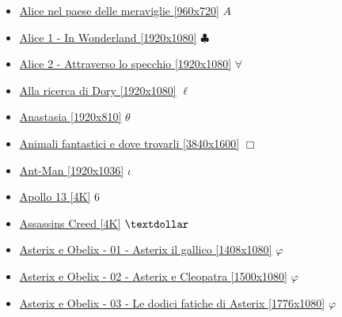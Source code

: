 		\begin{itemize}
			\item \href{https://mega.nz/#!6sgg1aoR!LqtZ_kNl_KkEZD5et9ZQqvr34ohTMY9fVGw2x4SwY9w} {Alice nel paese delle meraviglie [960x720]}  $A$ \\ 
			\item \href{https://mega.nz/#!q2wWwSqC!PEsPVFLOeyxeq1HClCM3ib4U19OoQJPZzBcJ7Tm_DfU} {Alice 1 - In Wonderland [1920x1080]}  $\clubsuit$ \\ 			
			\item \href{https://mega.nz/#!73Z1lSgC!HwGjrZ9o7kkqDOAoveOkxJDwV7PDYuWK7MoZPgDRnUk} {Alice 2 - Attraverso lo specchio [1920x1080]}  $\forall$ \\ 
			\item \href{https://mega.nz/#!qCwUiKDJ!02ZjZHbIGEUYqOOo9U9oBTf2lgYre5a6RET1-_W8WB8} {Alla ricerca di Dory [1920x1080]}  $\ell$ \\ 
			\item \href{https://mega.nz/#!kwklkarA!CVYBO3uf5Km4q9S2_9_ILvIRHpMTRM_34UA3HW02MU0} {Anastasia [1920x810]}  $\theta$ \\ 
			\item \href{https://mega.nz/#!pj4xTQgI!Kr5tkUxtOYhdpESdLys4J-SRkXQU_BFtF0vIrFVj7t0} {Animali fantastici e dove trovarli [3840x1600]}  $\Box$ \\ 
			\item \href{https://mega.nz/#!hpgQhSAI!gSLrpvHcrGcDXJMV6ebFZ2C9lwjsExgXBZlTXsWAyeY} {Ant-Man [1920x1036]}  $\iota$ \\ 
			\item \href{https://mega.nz/#!vWYyhQrA!v5BTudh0MRRvKEkaYnlxgJ77mE4-96_W_Fpj0Rjv6W0} {Apollo 13 [4K]}  $\oldstylenums{6}$ \\ 
			\item \href{https://mega.nz/#!O35nDIpY!BC3_sDZvY4kwDaneBo_jPAAEz2LoyR-SOhdMyF-cgwU} { Assassins Creed [4K]}  $\textdollar$ \\
			\item \href{https://mega.nz/#!sLoTWIAY!djUX8bpiYGwYAkc4J-LOCnKNOXuT1MI7HoWA-1Ov_h8} {Asterix e Obelix - 01 - Asterix il gallico [1408x1080]}  $\varphi$ \\
			\item \href{https://mega.nz/#!0b5VgQoD!Qp1bQSDGBid2E6FBxBFF4-Dk2eiZgoBll0uOVvBMB-k} {Asterix e Obelix - 02 - Asterix e Cleopatra [1500x1080]}  $\varphi$ \\
			\item \href{https://mega.nz/#!MSJHGbQI!-x9EGYJNCDXVHsHgZuxGTxfvS_w5M15rbx7eXwHKAEU} {Asterix e Obelix - 03 - Le dodici fatiche di Asterix [1776x1080]}  $\varphi$ \\

\end{itemize}
